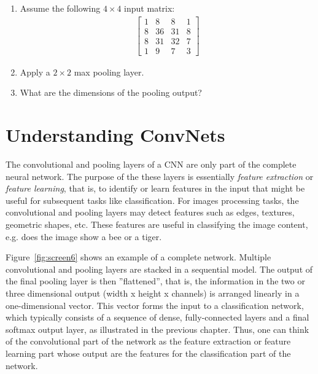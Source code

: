 \begin{exerciseboxpaper}
\begin{enumerate}
\item Assume the following $4 \times 4$ input matrix:
\begin{align*}
\begin{bmatrix} 1 & 8 & 8 & 1 \\ 
                8 & 36 & 31 & 8 \\ 
                8 & 31 & 32 & 7 \\
                1 & 9 & 7 & 3
\end{bmatrix}
\end{align*}
\item Apply a $2 \times 2$ max pooling layer. 
\item What are the dimensions of the pooling output?
\end{enumerate}
\end{exerciseboxpaper}

\FloatBarrier

\section{Understanding ConvNets}

The convolutional and pooling layers of a CNN are only part of the complete neural network. The purpose of the these layers is essentially \emph{feature extraction} or \emph{feature learning}, that is, to identify or learn features in the input that might be useful for subsequent tasks like classification. For images processing tasks, the convolutional and pooling layers may detect features such as edges, textures, geometric shapes, etc. These features are useful in classifying the image content, e.g. does the image show a bee or a tiger. 

Figure~\ref{fig:screen6} shows an example of a complete network. Multiple convolutional and pooling layers are stacked in a sequential model. The output of the final pooling layer is then ''flattened'', that is, the information in the two or three dimensional output (width x height x channels) is arranged linearly in a one-dimensional vector. This vector forms the input to a classification network, which typically consists of a sequence of dense, fully-connected layers and a final softmax output layer, as illustrated in the previous chapter. Thus, one can think of the convolutional part of the network as the feature extraction or feature learning part whose output are the features for the classification part of the network.

